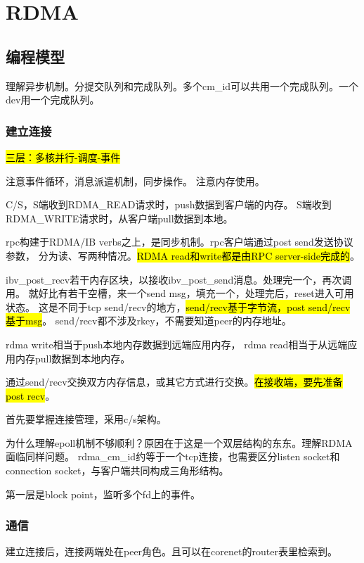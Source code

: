 \chapter{RDMA}

\section{编程模型}

理解异步机制。分提交队列和完成队列。多个cm\_id可以共用一个完成队列。一个dev用一个完成队列。

\subsection{建立连接}

\hl{三层：多核并行-调度-事件}

注意事件循环，消息派遣机制，同步操作。
注意内存使用。

C/S，S端收到RDMA\_READ请求时，push数据到客户端的内存。
S端收到RDMA\_WRITE请求时，从客户端pull数据到本地。

rpc构建于RDMA/IB verbs之上，是同步机制。rpc客户端通过post send发送协议参数，
分为读、写两种情况。\hl{RDMA read和write都是由RPC server-side完成的}。

ibv\_post\_recv若干内存区块，以接收ibv\_post\_send消息。处理完一个，再次调用。
就好比有若干空槽，来一个send msg，填充一个，处理完后，reset进入可用状态。
这是不同于tcp send/recv的地方，\hl{send/recv基于字节流，post send/recv基于msg}。
send/recv都不涉及rkey，不需要知道peer的内存地址。

rdma write相当于push本地内存数据到远端应用内存，
rdma read相当于从远端应用内存pull数据到本地内存。

通过send/recv交换双方内存信息，或其它方式进行交换。\hl{在接收端，要先准备post recv}。

首先要掌握连接管理，采用c/s架构。

为什么理解epoll机制不够顺利？原因在于这是一个双层结构的东东。理解RDMA面临同样问题。
rdma\_cm\_id约等于一个tcp连接，也需要区分listen socket和connection socket，与客户端共同构成三角形结构。

第一层是block point，监听多个fd上的事件。

\subsection{通信}

建立连接后，连接两端处在peer角色。且可以在corenet的router表里检索到。

